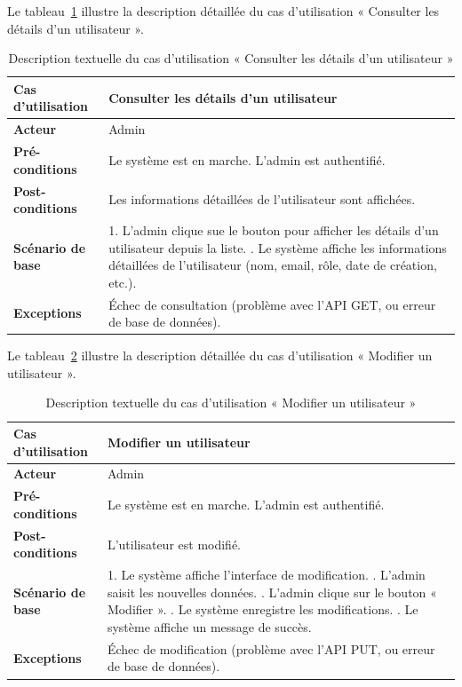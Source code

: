 \newpage
Le tableau~\ref{tab:view_user_details} illustre la description détaillée du cas d'utilisation « Consulter les détails d’un utilisateur ».

\begin{table}[!ht]
\centering
\caption{Description textuelle du cas d’utilisation « Consulter les détails d’un utilisateur »}
\label{tab:view_user_details}
\renewcommand{\arraystretch}{1.2}
\begin{tabular}{|p{4.2cm}|p{11cm}|}
\hline
\textbf{Cas d'utilisation} & Consulter les détails d’un utilisateur \\
\hline
\textbf{Acteur} & Admin \\
\hline
\textbf{Pré-conditions} & Le système est en marche. \newline L’admin est authentifié. \\
\hline
\textbf{Post-conditions} & Les informations détaillées de l’utilisateur sont affichées. \\
\hline
\textbf{Scénario de base} & 
1. L’admin clique sue le bouton pour afficher les détails d'un utilisateur depuis la liste. \newline
2. Le système affiche les informations détaillées de l’utilisateur (nom, email, rôle, date de création, etc.). \\
\hline
\textbf{Exceptions} & 
Échec de consultation (problème avec l’API GET, ou erreur de base de données). \\
\hline
\end{tabular}
\end{table}
\vspace{0.5cm}
Le tableau~\ref{tab:update_user} illustre la description détaillée du cas d'utilisation « Modifier un utilisateur ».

\begin{table}[!ht]
\centering
\caption{Description textuelle du cas d’utilisation « Modifier un utilisateur »}
\label{tab:update_user}
\renewcommand{\arraystretch}{1.2}
\begin{tabular}{|p{4.2cm}|p{11cm}|}
\hline
\textbf{Cas d'utilisation} & Modifier un utilisateur \\
\hline
\textbf{Acteur} & Admin \\
\hline
\textbf{Pré-conditions} & Le système est en marche. \newline L’admin est authentifié. \\
\hline
\textbf{Post-conditions} & L'utilisateur est modifié. \\
\hline
\textbf{Scénario de base} & 
1. Le système affiche l’interface de modification. \newline
2. L’admin saisit les nouvelles données. \newline
3. L’admin clique sur le bouton « Modifier ». \newline
4. Le système enregistre les modifications. \newline
5. Le système affiche un message de succès. \\
\hline
\textbf{Exceptions} & 
Échec de modification (problème avec l’API PUT, ou erreur de base de données). \\
\hline
\end{tabular}
\end{table}

